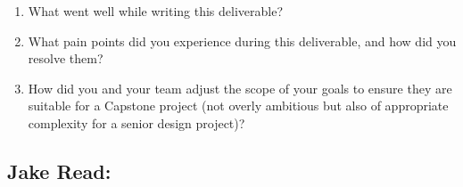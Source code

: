 \documentclass{article}
\begin{document}
\begin{enumerate}
    \item What went well while writing this deliverable?
    \item What pain points did you experience during this deliverable, and how
    did you resolve them?
    \item How did you and your team adjust the scope of your goals to ensure
    they are suitable for a Capstone project (not overly ambitious but also of
    appropriate complexity for a senior design project)?
\end{enumerate}

%

\subsection*{Jake Read:}\label{subsec:jake-read-reflection}
\end{document}
